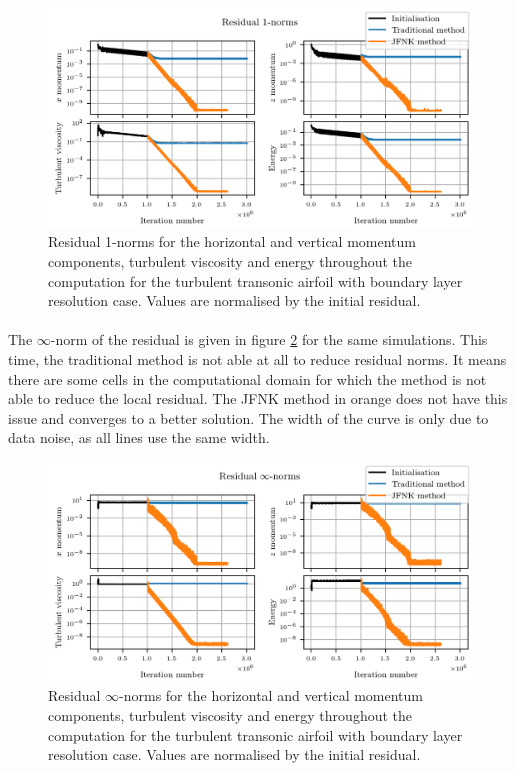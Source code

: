         \begin{figure}
          \centering
          \includegraphics{figures/rae_residuals_fine_l1.png}
          \caption{Residual 1-norms for the horizontal and vertical momentum components, turbulent viscosity and energy throughout the computation for the turbulent transonic airfoil with boundary layer resolution case.
          Values are normalised by the initial residual.}
          \label{fig:rae_residuals_fine_l1}
        \end{figure}

        \paragraph{}
        The $\infty$-norm of the residual is given in figure \ref{fig:rae_residuals_fine_linf} for the same simulations.
        This time, the traditional method is not able at all to reduce residual norms.
        It means there are some cells in the computational domain for which the method is not able to reduce the local residual.
        The JFNK method in orange does not have this issue and converges to a better solution.
        The width of the curve is only due to data noise, as all lines use the same width.

        \begin{figure}
          \centering
          \includegraphics{figures/rae_residuals_fine_linf.png}
          \caption{Residual $\infty$-norms for the horizontal and vertical momentum components, turbulent viscosity and energy throughout the computation for the turbulent transonic airfoil with boundary layer resolution case.
          Values are normalised by the initial residual.}
          \label{fig:rae_residuals_fine_linf}
        \end{figure}


